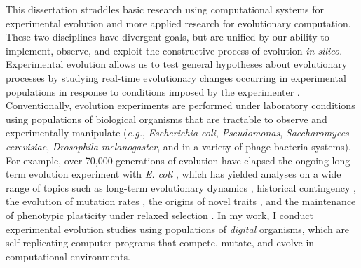 



This dissertation straddles basic research using computational systems for experimental evolution and more applied research for evolutionary computation.
These two disciplines have divergent goals, but are unified by our ability to implement, observe, and exploit the constructive process of evolution \textit{in silico}.
Experimental evolution allows us to test general hypotheses about evolutionary processes by studying real-time evolutionary changes occurring in experimental populations in response to conditions imposed by the experimenter \citep{kawecki_experimental_2012}.
Conventionally, evolution experiments are performed under laboratory conditions using populations of biological organisms that are tractable to observe and experimentally manipulate (\textit{e.g.}, \textit{Escherichia coli}, \textit{Pseudomonas}, \textit{Saccharomyces cerevisiae}, \textit{Drosophila melanogaster}, and in a variety of phage-bacteria systems).
For example, over 70,000 generations of evolution have elapsed the ongoing long-term evolution experiment with \textit{E. coli} \citep{barrick_test_2020}, which has yielded analyses on a wide range of topics such as
long-term evolutionary dynamics \citep{wiser_long-term_2013,good_dynamics_2017},
historical contingency \citep{travisano_experimental_1995,card_historical_2019},
the evolution of mutation rates \citep{sniegowski_evolution_1997},
the origins of novel traits \citep{blount_historical_2008},
and the maintenance of phenotypic plasticity under relaxed selection \citep{grant_maintenance_2020}.
In my work, I conduct experimental evolution studies using populations of \textit{digital} organisms, which are self-replicating computer programs that compete, mutate, and evolve in computational environments.

